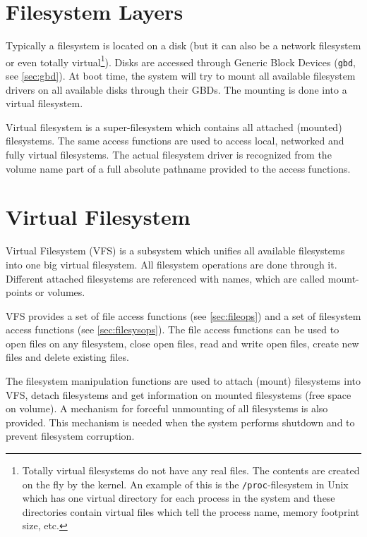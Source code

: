 \documentclass[twoside,a4paper]{report}
\begin{document}
\section{Filesystem Layers}


Typically a filesystem is located on a disk (but it can also be a
network filesystem or even totally virtual\footnote{Totally virtual
filesystems do not have any real files. The contents are created on
the fly by the kernel. An example of this is the
\texttt{/proc}-filesystem in Unix which has one virtual directory for
each process in the system and these directories contain virtual files
which tell the process name, memory footprint size, etc.}). Disks are
accessed through Generic Block Devices (\texttt{gbd}, see
\autoref{sec:gbd}). At boot time, the system will try to mount all
available filesystem drivers on all available disks through their
GBDs. The mounting is done into a virtual filesystem.

Virtual filesystem is a super-filesystem which contains all attached
(mounted) filesystems. The same access functions are used to access
local, networked and fully virtual filesystems. The actual filesystem
driver is recognized from the volume name part of a full absolute
pathname provided to the access functions.

\section{Virtual Filesystem}
\label{sec:vfs}


Virtual Filesystem (VFS) is a subsystem which unifies all available
filesystems into one big virtual filesystem. All filesystem operations
are done through it. Different attached filesystems are referenced
with names, which are called mount-points  or
volumes.

VFS provides a set of file access functions (see
\autoref{sec:fileops}) and a set of filesystem access functions (see
\autoref{sec:filesysops}). The file access functions can be used to
open files on any filesystem, close open files, read and write open
files, create new files and delete existing files.

The filesystem manipulation functions are used to attach (mount)
 filesystems into VFS, detach filesystems
and get information on mounted filesystems (free space on volume). A
mechanism for forceful unmounting of all filesystems is also
provided. This mechanism is needed when the system performs shutdown
and to prevent filesystem corruption.
\end{document}

